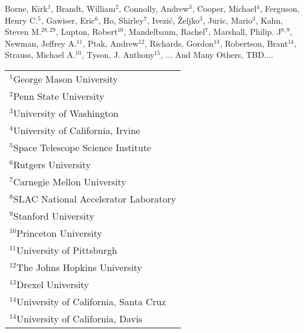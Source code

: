 Borne, Kirk$^{1}$,
Brandt, William$^{2}$,
Connolly, Andrew$^{3}$,
Cooper, Michael$^{4}$,
Ferguson, Henry C.$^{5}$,
Gawiser, Eric$^{6}$,
Ho, Shirley$^{7}$,
Ivezi\'{c}, \v{Z}eljko$^{3}$,
Juric, Mario$^{3}$,
Kahn, Steven M.$^{28, 29}$,
Lupton, Robert$^{10}$,
Mandelbaum, Rachel$^{7}$,
Marshall, Philip. J$^{8,9}$,
Newman, Jeffrey A.$^{11}$,
Ptak, Andrew$^{12}$,
Richards, Gordon$^{13}$,
Robertson, Brant$^{14}$,
Strauss, Michael A.$^{10}$,
Tyson, J. Anthony$^{15}$,
... And Many Others, TBD....

\vspace*{5mm}

\begin{table}[htp]
\centering
{\renewcommand{\arraystretch}{0.8}
\begin{tabular}{p{10cm}}
$^{1}$George Mason University\\
$^{2}$Penn State University\\
$^{3}$University of Washington\\
$^{4}$University of California, Irvine\\
$^{5}$Space Telescope Science Institute\\
$^{6}$Rutgers University\\
$^{7}$Carnegie Mellon University\\
$^{8}$SLAC National Accelerator Laboratory\\
$^{9}$Stanford University\\
$^{10}$Princeton University\\
$^{11}$University of Pittsburgh\\
$^{12}$The Johns Hopkins University\\
$^{13}$Drexel University\\
$^{14}$University of California, Santa Cruz\\
$^{14}$University of California, Davis\\
\end{tabular}
}
\end{table}
